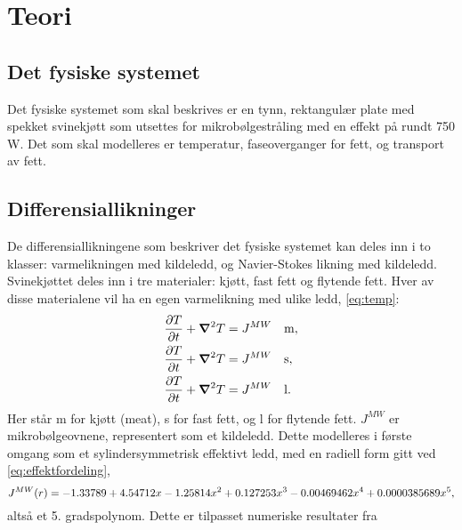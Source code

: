 \chapter{Teori}
\section{Det fysiske systemet}
Det fysiske systemet som skal beskrives er en tynn, rektangulær plate med
spekket svinekjøtt som utsettes for mikrobølgestråling med en effekt på rundt
750 W. Det som skal modelleres er temperatur, faseoverganger for fett, og
transport av fett.

\section{Differensiallikninger}
De differensiallikningene som beskriver det fysiske systemet kan deles inn i to
klasser: varmelikningen med kildeledd, og Navier-Stokes likning med kildeledd.
Svinekjøttet deles inn i tre materialer: kjøtt, fast fett og flytende fett. Hver
av disse materialene vil ha en egen varmelikning med ulike ledd, \cref{eq:temp}:
\begin{align}
  \label{eq:temp}
  \frac{\partial T}{\partial t} + \mbox{\boldmath$ \nabla $} ^2 T &= J^{MW} \quad \rm{m,} \\
  \frac{\partial T}{\partial t} + \mbox{\boldmath$ \nabla $} ^2 T &= J^{MW}  \quad \rm{s,} \\
  \frac{\partial T}{\partial t} + \mbox{\boldmath$ \nabla $} ^2 T &= J^{MW}  \quad \rm{l.}
\end{align}
Her står m for kjøtt (meat), s for fast fett, og l for flytende fett. $J^{MW}$
er mikrobølgeovnene, representert som et kildeledd. Dette modelleres i første
omgang som et sylindersymmetrisk effektivt ledd, med en radiell form gitt ved
\cref{eq:effektfordeling},
\begin{equation}
  J^{MW}(r) = -1.33789 + 4.54712x - 1.25814x^2 + 0.127253x^3 - 0.00469462x^4 + 0.0000385689x^5 \rm{,}
  \label{eq:effektfordeling}
\end{equation}
altså et 5. gradspolynom. Dette er tilpasset numeriske resultater fra \cite{huang+zhu}
